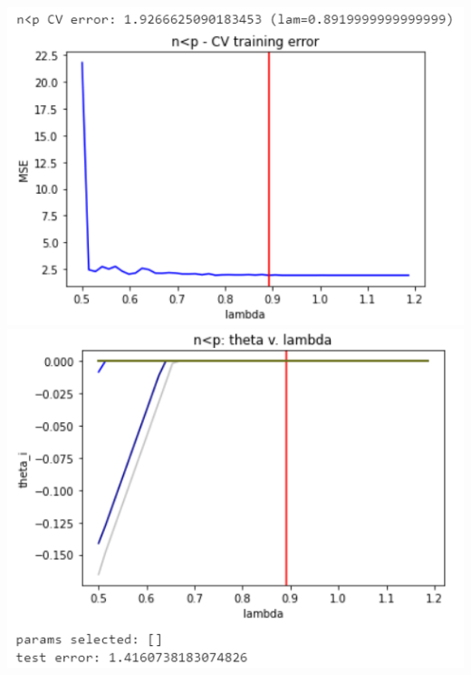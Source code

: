 \documentclass[11pt]{article}
\begin{document}
\begin{center}
\includegraphics[scale=0.7]{charts/ridge_st_corr_n_lt_p_err.PNG}
\includegraphics[scale=0.7]{charts/ridge_st_corr_n_lt_p_thetas.PNG}


\end{center}
\end{document}
